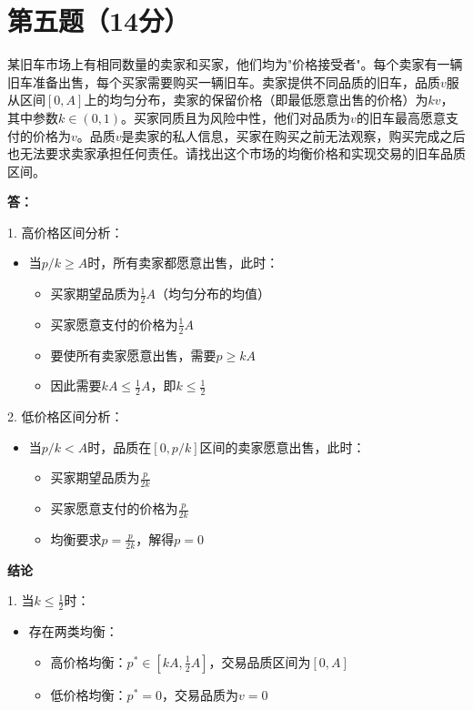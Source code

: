 \documentclass[12pt]{article}
\begin{document}
\section*{第五题（14分）}
某旧车市场上有相同数量的卖家和买家，他们均为"价格接受者"。每个卖家有一辆旧车准备出售，每个买家需要购买一辆旧车。卖家提供不同品质的旧车，品质$v$服从区间$[0,A]$上的均匀分布，卖家的保留价格（即最低愿意出售的价格）为$kv$，其中参数$k\in(0,1)$。买家同质且为风险中性，他们对品质为$v$的旧车最高愿意支付的价格为$v$。品质$v$是卖家的私人信息，买家在购买之前无法观察，购买完成之后也无法要求卖家承担任何责任。请找出这个市场的均衡价格和实现交易的旧车品质区间。

\noindent\textbf{答：}



1. 高价格区间分析：
\begin{itemize}
\item 当$p/k\geq A$时，所有卖家都愿意出售，此时：
    \begin{itemize}
    \item 买家期望品质为$\frac{1}{2}A$（均匀分布的均值）
    \item 买家愿意支付的价格为$\frac{1}{2}A$
    \item 要使所有卖家愿意出售，需要$p\geq kA$
    \item 因此需要$kA\leq\frac{1}{2}A$，即$k\leq\frac{1}{2}$
    \end{itemize}
\end{itemize}

2. 低价格区间分析：
\begin{itemize}
\item 当$p/k<A$时，品质在$[0,p/k]$区间的卖家愿意出售，此时：
    \begin{itemize}
    \item 买家期望品质为$\frac{p}{2k}$
    \item 买家愿意支付的价格为$\frac{p}{2k}$
    \item 均衡要求$p=\frac{p}{2k}$，解得$p=0$
    \end{itemize}
\end{itemize}

\noindent\textbf{结论}

1. 当$k\leq\frac{1}{2}$时：
\begin{itemize}
\item 存在两类均衡：
    \begin{itemize}
    \item 高价格均衡：$p^*\in[kA,\frac{1}{2}A]$，交易品质区间为$[0,A]$
    \item 低价格均衡：$p^*=0$，交易品质为$v=0$
    \end{itemize}
\end{itemize}
\end{document}
